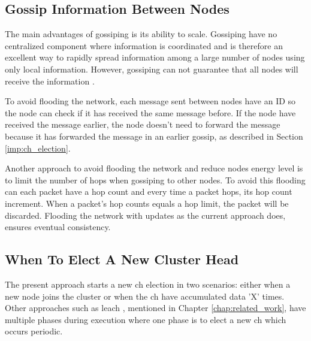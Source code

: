 \documentclass[USenglish]{uit-thesis}
\begin{document}






\subsection{Gossip Information Between Nodes}
The main advantages of gossiping is its ability to scale. Gossiping have no centralized component where information is coordinated and is therefore an excellent way to rapidly spread information among a large number of nodes using only local information. However, gossiping can not guarantee that all nodes will receive the information \cite{demers}.

To avoid flooding the network, each message sent between nodes have an ID so the node can check if it has received the same message before. If the node have received the message earlier, the node doesn't need to forward the message because it has forwarded the message in an earlier gossip, as described in Section \ref{imp:ch_election}.

\newpage

Another approach to avoid flooding the network and reduce nodes energy level is to limit the number of hops when gossiping to other nodes. To avoid this flooding can each packet have a hop count and every time a packet hops, its hop count increment. When a packet's hop counts equals a hop limit, the packet will be discarded. Flooding the network with updates as the current approach does, ensures eventual consistency.
 
 
\subsection{When To Elect A New Cluster Head}
The present approach starts a new \gls{ch} election in two scenarios: either when a new node joins the cluster or when the \gls{ch} have accumulated data 'X' times. Other approaches such as \gls{leach} \cite{leach}, mentioned in Chapter \ref{chap:related_work}, have multiple phases during execution where one phase is to elect a new \gls{ch} which occurs periodic.
\end{document}
